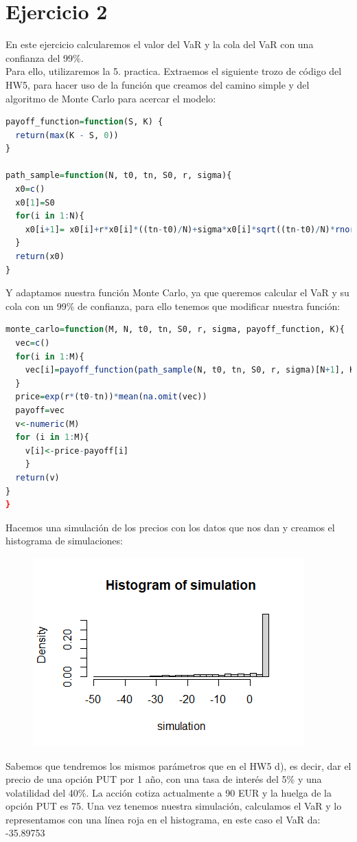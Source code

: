 \documentclass[a4paper]{article}
\begin{document}
\section*{Ejercicio 2}
En este ejercicio calcularemos el valor del VaR y la cola del VaR con una confianza del 99\%. \\
Para ello, utilizaremos la 5. practica.
Extraemos el siguiente trozo de código del HW5, para hacer uso de la función que creamos del camino simple y del algoritmo de Monte Carlo para acercar el modelo:
\\
\begin{lstlisting}[language=R]
payoff_function=function(S, K) {
  return(max(K - S, 0))
}

path_sample=function(N, t0, tn, S0, r, sigma){
  x0=c() 
  x0[1]=S0 
  for(i in 1:N){
    x0[i+1]= x0[i]+r*x0[i]*((tn-t0)/N)+sigma*x0[i]*sqrt((tn-t0)/N)*rnorm(1)
  }
  return(x0)
}
\end{lstlisting}
Y adaptamos nuestra función Monte Carlo, ya que queremos calcular el VaR y su cola con un 99\% de confianza, para ello tenemos que modificar nuestra función:
\begin{lstlisting}[language=R]
monte_carlo=function(M, N, t0, tn, S0, r, sigma, payoff_function, K){
  vec=c() 
  for(i in 1:M){
    vec[i]=payoff_function(path_sample(N, t0, tn, S0, r, sigma)[N+1], K)
  }
  price=exp(r*(t0-tn))*mean(na.omit(vec)) 
  payoff=vec
  v<-numeric(M)
  for (i in 1:M){
    v[i]<-price-payoff[i]
    }
  return(v)
}
}
\end{lstlisting}
Hacemos una simulación de los precios con los datos que nos dan y creamos el histograma de simulaciones:
\begin{figure}[H]
    \centering
    \includegraphics[width=0.6\linewidth]{Rplot111.png}  
\end{figure}
 Sabemos que tendremos los mismos parámetros que en el HW5 d), es decir, dar el precio de una opción PUT por 1 año, con una tasa de interés del 5\% y una volatilidad del 40\%. La acción cotiza actualmente a 90 EUR y la huelga de la opción PUT es 75. Una vez tenemos nuestra simulación, calculamos el VaR y lo representamos con una línea roja en el histograma, en este caso el VaR da: -35.89753
\end{document}
